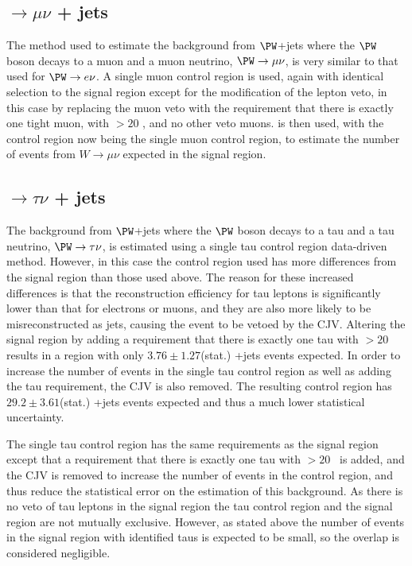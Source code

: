 
\subsection{\PW$\rightarrow \mu\nu$ + jets}%
\label{sec:promptwmunu}
The method used to estimate the background from $\PW$+jets where the $\PW$ boson decays to a muon and a muon neutrino, $\PW\rightarrow\mu\nu$, is very similar to that used for $\PW\rightarrow e\nu$. A single muon control region is used, again with identical selection to the signal region except for the modification of the lepton veto, in this case by replacing the muon veto with the requirement that there is exactly one tight muon, with \pt$>20$ \GeV, and no other veto muons.  is then used, with the control region now being the single muon control region, to estimate the number of events from $W\rightarrow\mu\nu$ expected in the signal region.


\subsection{\PW$\rightarrow \tau\nu$ + jets}%
\label{sec:promptwtaunu}
The background from $\PW$+jets where the $\PW$ boson decays to a tau and a tau neutrino, $\PW\rightarrow\tau\nu$, is estimated using a single tau control region data-driven method. However, in this case the control region used has more differences from the signal region than those used above. The reason for these increased differences is that the reconstruction efficiency for tau leptons is significantly lower than that for electrons or muons, and they are also more likely to be misreconstructed as jets, causing the event to be vetoed by the \ac{CJV}. Altering the signal region by adding a requirement that there is exactly one tau with \pt$>20$ \GeV\, results in a region with only $3.76\pm 1.27$(stat.) \PW+jets events expected. In order to increase the number of events in the single tau control region as well as adding the tau requirement, the \ac{CJV} is also removed. The resulting control region has $29.2\pm 3.61$(stat.) \PW+jets events expected and thus a much lower statistical uncertainty.

The single tau control region has the same requirements as the signal region except that a requirement that there is exactly one tau with \pt$>20$ \GeV\, is added, and the \ac{CJV} is removed to increase the number of events in the control region, and thus reduce the statistical error on the estimation of this background. As there is no veto of tau leptons in the signal region the tau control region and the signal region are not mutually exclusive. However, as stated above the number of events in the signal region with identified taus is expected to be small, so the overlap is considered negligible.

